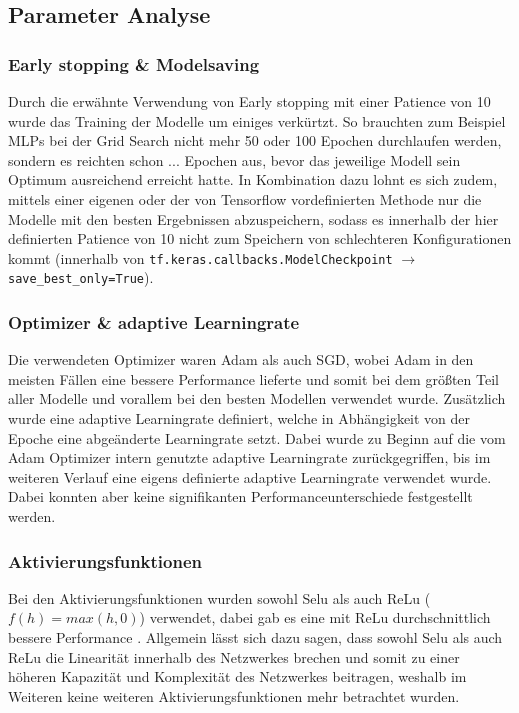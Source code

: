 \documentclass[manuscript,screen,review]{acmart} %
\begin{document}
\subsection{Parameter Analyse}

\subsubsection{Early stopping & Modelsaving}
Durch die erwähnte Verwendung von Early stopping mit einer Patience von 10 wurde das Training der Modelle um einiges verkürtzt. So brauchten zum Beispiel MLPs bei der Grid Search nicht mehr 50 oder 100 Epochen durchlaufen werden, sondern es reichten schon ...  Epochen aus, bevor das jeweilige Modell sein Optimum ausreichend erreicht hatte. In Kombination dazu lohnt es sich zudem, mittels einer eigenen oder der von Tensorflow vordefinierten Methode nur die Modelle mit den besten Ergebnissen abzuspeichern, sodass es innerhalb der hier definierten Patience von 10 nicht zum Speichern von schlechteren Konfigurationen kommt (innerhalb von \texttt{tf.keras.callbacks.ModelCheckpoint} $\rightarrow$  \texttt{save\_best\_only=True}).

\subsubsection{Optimizer \& adaptive Learningrate}
Die verwendeten Optimizer waren Adam als auch SGD, wobei Adam in den meisten Fällen eine bessere Performance lieferte und somit bei dem größten Teil aller Modelle und vorallem bei den besten Modellen verwendet wurde.
Zusätzlich wurde eine adaptive Learningrate definiert, welche in Abhängigkeit von der Epoche eine abgeänderte Learningrate setzt. Dabei wurde zu Beginn auf die vom Adam Optimizer intern genutzte adaptive Learningrate zurückgegriffen, bis im weiteren Verlauf eine eigens definierte adaptive Learningrate verwendet wurde. Dabei konnten aber keine signifikanten Performanceunterschiede festgestellt werden. 

\subsubsection{Aktivierungsfunktionen}
Bei den Aktivierungsfunktionen wurden sowohl Selu  als auch ReLu ($f(h)=max(h,0)$) verwendet, dabei gab es eine mit ReLu durchschnittlich bessere Performance . Allgemein lässt sich dazu sagen, dass sowohl Selu als auch ReLu die Linearität innerhalb des Netzwerkes brechen und somit zu einer höheren Kapazität und Komplexität des Netzwerkes beitragen, weshalb im Weiteren keine weiteren Aktivierungsfunktionen mehr betrachtet wurden.
\end{document}
